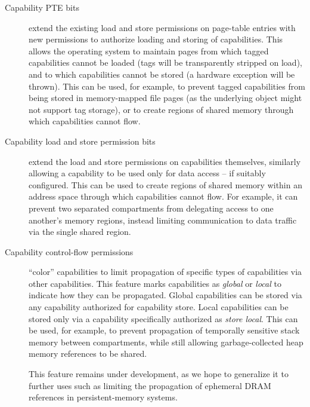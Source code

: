 \begin{description}

\item[Capability PTE bits] extend the existing load and store
  permissions on page-table entries with new permissions to authorize loading and storing
  of capabilities.
  This allows the operating system to maintain pages from which tagged
  capabilities cannot be loaded (tags will be transparently stripped on load),
  and to which capabilities cannot be stored (a hardware exception will be
  thrown).
  This can be used, for example, to prevent tagged capabilities from being
  stored in memory-mapped file pages (as the underlying object might not
  support tag storage), or to create regions of shared memory through which
  capabilities cannot flow.

\item[Capability load and store permission bits] extend the load and store
  permissions on capabilities themselves, similarly allowing a capability to
  be used only for data access -- if suitably configured.
  This can be used to create regions of shared memory within an address
  space through which capabilities cannot flow.
  For example, it can
prevent
  two separated compartments from
  delegating access to one another's memory regions, instead limiting
  communication to data traffic via the single shared region.

\item[Capability control-flow permissions] ``color'' capabilities to limit
  propagation of specific types of capabilities via other capabilities.
  This feature marks capabilities as \textit{global} or \textit{local} to
  indicate how they can be propagated.
  Global capabilities can be stored via any capability authorized for
  capability store.
  Local capabilities can be stored only via a capability specifically
  authorized as \textit{store local}.
  This can be used, for example, to prevent propagation of temporally
  sensitive stack memory between compartments, while still allowing
  garbage-collected heap memory references to be shared.

  This feature remains under development, as we hope to generalize it to
  further uses such as limiting the propagation of ephemeral DRAM references
  in persistent-memory systems.

\end{description}

